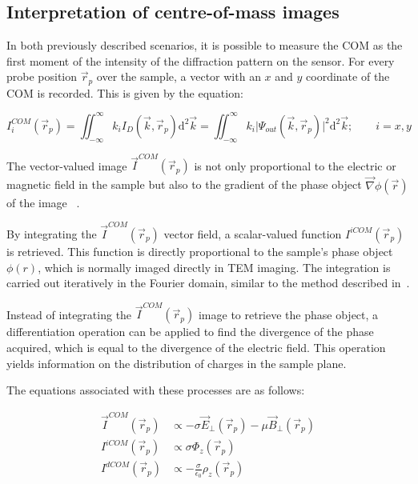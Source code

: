 \subsection{Interpretation of centre-of-mass images}
%
In both previously described scenarios, it is possible to measure the COM as the first moment of the intensity of the diffraction pattern on the sensor. For every probe position $\vec{r}_p$ over the sample, a vector with an $x$ and $y$ coordinate of the COM is recorded. This is given by the equation:

\begin{equation}
    I^{COM}_{i} (\vec{r}_p) = \iint_{-\infty}^{\infty} k_{i} I_D(\vec{k}, \vec{r}_p) \mathrm{d}^2\vec{k} = \iint_{-\infty}^{\infty}k_i \vert \Psi_{out}(\vec{k},\vec{r}_p)\vert^2 \mathrm{d}^2 \vec{k}; \qquad i = x,y
    \label{eq:com_int}
\end{equation}

The vector-valued image $\vec{I}^{COM}(\vec{r}_p)$ is not only proportional to the electric or magnetic field in the sample but also to the gradient of the phase object $\vec{\nabla}\phi(\vec{r})$ of the image~ \cite{lazicPhaseContrastSTEM2016}.

By integrating the $\vec{I}^{COM}(\vec{r}_p)$ vector field, a scalar-valued function $I^{iCOM}(\vec{r}_p)$ is retrieved. 
%
This function is directly proportional to the sample's phase object $\phi(r)$, which is normally imaged directly in TEM imaging. 
%
The integration is carried out iteratively in the Fourier domain, similar to the method described in~\cite{varnavidesIterativePhaseRetrieval2023}.

Instead of integrating the $\vec{I}^{COM}(\vec{r}_p)$ image to retrieve the phase object, a  differentiation operation can be applied to find the divergence of the phase acquired, which is equal to the divergence of the electric field. This operation yields information on the distribution of charges in the sample plane.

The equations associated with these processes are as follows:

\begin{align}
    \vec{I}^{COM}(\vec{r}_p) &\propto -\sigma\vec{E}_{\perp}(\vec{r}_p) - \mu \vec{B}_{\perp}(\vec{r}_p)\\
    I^{iCOM}(\vec{r}_p) &\propto \sigma \Phi_z(\vec{r}_p)\\
    I^{dCOM}(\vec{r}_p) &\propto -\frac{\sigma}{\epsilon_0}\rho_z(\vec{r}_p) 
\end{align}

